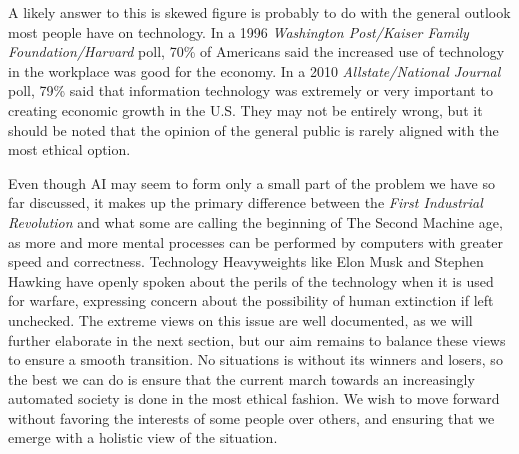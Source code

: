 A likely answer to this is skewed figure is probably to do with the 
general outlook most people have on technology. In a 1996 
\textit{Washington Post/Kaiser Family Foundation/Harvard} poll, 70\% of 
Americans said the increased use of technology in the workplace was good 
for the economy. In a 2010 \textit{Allstate/National Journal} poll, 
79\% said that information technology was extremely or very important 
to creating economic growth in the U.S. They may not be entirely wrong, 
but it should be noted that the opinion of the general public is rarely 
aligned with the most ethical option.


Even though AI may seem to form only a small part of the problem we have 
so far discussed, it makes up 
the primary difference between the \textit{First Industrial Revolution} 
and what some are calling the beginning of The Second Machine age, as 
more and more mental processes can be performed by computers with 
greater speed and correctness.  Technology Heavyweights like Elon Musk 
and Stephen Hawking have openly spoken about the perils of the 
technology when it is used for warfare\cite{aidangers}, expressing 
concern about the possibility of human extinction if left unchecked. 
The extreme views on this issue are well documented, as we will further 
elaborate in the next section, but our aim remains to balance 
these views to ensure a smooth transition.  No situations is without 
its winners and losers, so the best we can do is ensure that the current 
march towards an increasingly automated society is done in the most 
ethical fashion. We wish to move forward without favoring the interests 
of some people over others, and ensuring that we emerge with a holistic 
view of the situation.


